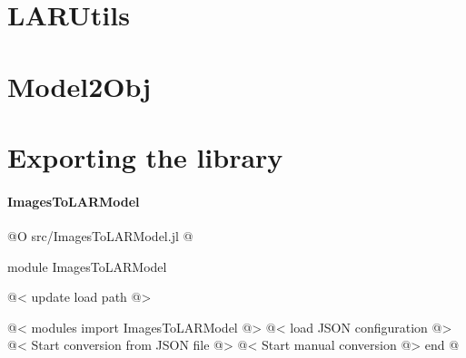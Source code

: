 \documentclass[11pt,oneside]{article}	%
\begin{document}
\section{LARUtils}\label{sec:LARUtils}

\section{Model2Obj}\label{sec:Model2Obj}


\section{Exporting the library}

\paragraph{ImagesToLARModel}
@O src/ImagesToLARModel.jl
@{module ImagesToLARModel

@< update load path @>

@< modules import ImagesToLARModel @>
@< load JSON configuration @>
@< Start conversion from JSON file @>
@< Start manual conversion @>
end
@}
\end{document}
